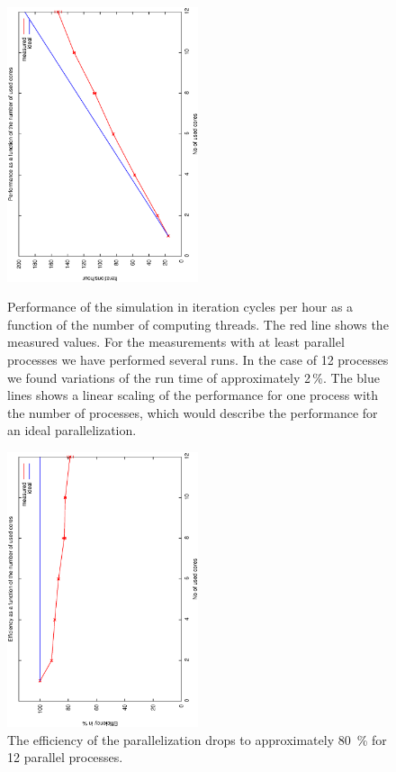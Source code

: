 \documentclass[a4paper,10pt]{article}
\begin{document}
\begin{appendix}
\begin{figure}
\begin{center}
\includegraphics[width=0.5\textwidth, angle =-90]{performanceplot}
\end{center}
\caption{Performance of the simulation in iteration cycles per hour as a 
function of the number of computing threads. The red line shows the measured 
values. For the measurements with at least parallel processes we have performed 
several runs. In the case of 12 processes we found variations of the run time of 
approximately 2\,\%. The blue lines shows a linear scaling of the performance 
for one process with the number of processes, which would describe the 
performance for an ideal parallelization.
} 
\label{fig:performanceplot}
\begin{center}
\includegraphics[width=0.5\textwidth, angle=-90]{efficiencyplot}
\end{center}
\caption{The efficiency of the parallelization drops to approximately 80\, \% 
for 12 parallel processes.}
\label{fig:efficiencyplot}
\end{figure}
 
\end{appendix}


\end{document}
